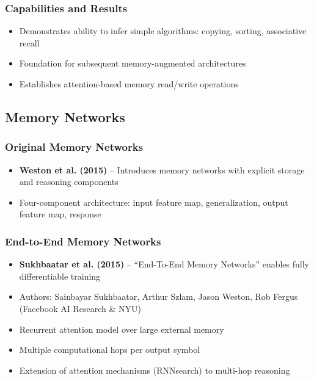 \documentclass[11pt,letterpaper]{article}
\begin{document}
\subsubsection{Capabilities and Results}
\begin{itemize}[leftmargin=*]
    \item Demonstrates ability to infer simple algorithms: copying, sorting, associative recall
    \item Foundation for subsequent memory-augmented architectures
    \item Establishes attention-based memory read/write operations
\end{itemize}

\subsection{Memory Networks}

\subsubsection{Original Memory Networks}
\begin{itemize}[leftmargin=*]
    \item \textbf{Weston et al. (2015)} -- Introduces memory networks with explicit storage and reasoning components
    \item Four-component architecture: input feature map, generalization, output feature map, response
\end{itemize}

\subsubsection{End-to-End Memory Networks}
\begin{itemize}[leftmargin=*]
    \item \textbf{Sukhbaatar et al. (2015)} -- ``End-To-End Memory Networks'' enables fully differentiable training \cite{sukhbaatar2015end}
    \item Authors: Sainbayar Sukhbaatar, Arthur Szlam, Jason Weston, Rob Fergus (Facebook AI Research \& NYU)
    \item Recurrent attention model over large external memory
    \item Multiple computational hops per output symbol
    \item Extension of attention mechanisms (RNNsearch) to multi-hop reasoning
\end{itemize}
\end{document}
